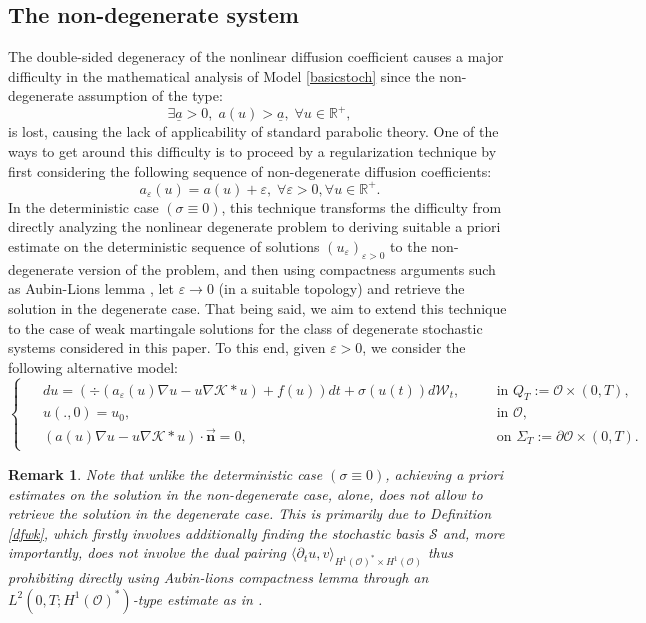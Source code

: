 \documentclass[10pt,number,preprint,times]{elsarticle}
\numberwithin{equation}{section} %
\newtheorem{rem}{Remark}[section]
\begin{document}
\subsection{The non-degenerate system}
The double-sided degeneracy of the nonlinear diffusion coefficient causes a major difficulty in the mathematical analysis of Model \eqref{basicstoch} since the non-degenerate assumption of the type: 
$$
\exists \underline{a}>0,\; a(u)>\underline{a}, \; \forall u \in \mathbb{R}^+,
$$
is lost, causing the lack of applicability of standard parabolic theory. One of the ways to get around this difficulty is to proceed by a regularization technique by first considering the following sequence of non-degenerate diffusion coefficients:
$$
a_\varepsilon(u)=a(u)+\varepsilon,\; \forall \varepsilon>0, \forall u \in \mathbb{R}^+.
$$ 
In the deterministic case $(\sigma \equiv 0)$, this technique transforms the difficulty from directly analyzing the nonlinear degenerate problem to deriving suitable a priori estimate on the deterministic sequence of solutions $\left(u_\varepsilon\right)_{\varepsilon>0}$ to the non-degenerate version of the problem, and then using compactness arguments such as Aubin-Lions lemma \cite{simon1986compact}, let $\varepsilon \rightarrow 0$ (in a suitable topology) and retrieve the solution in the degenerate case. That being said, we aim to extend this technique to the case of weak martingale solutions for the class of degenerate stochastic systems considered in this paper. To this end, given $\varepsilon>0$, we consider the following alternative model:
\begin{equation}\label{basicstochnondeg}
	\begin{cases}
		\begin{split}
			&du=\left(\div\left(a_\varepsilon(u) \nabla u-u \nabla \mathcal{K} \ast u\right)+f(u)\right)dt+\sigma(u(t))d\mathcal{W}_t, &&\quad \text{in } Q_T:=\mathcal{O} \times (0,T),\\
			&u(.,0)=u_0,  &&\quad \text{in } \mathcal{O},\\
			&\left(a(u)\nabla u-u \nabla \mathcal{K} \ast u\right) \cdot \overrightarrow{\textbf{n}}=0, \;\; &&\quad \text{on } \Sigma_T:=\partial \mathcal{O} \times (0,T).
		\end{split}
	\end{cases}
\end{equation}
\begin{rem}
Note that unlike the deterministic case $(\sigma \equiv 0)$, achieving a priori estimates on the solution in the non-degenerate case, alone, does not allow to retrieve the solution in the degenerate case. This is primarily due to Definition \ref{dfwk}, which firstly involves additionally finding the stochastic basis $\mathcal{S}$ and, more importantly, does not involve the dual pairing $\langle \partial_t u,v \rangle_{H^1(\mathcal{O})^* \times H^1(\mathcal{O})}$ thus prohibiting directly using Aubin-lions compactness lemma through an $L^2(0,T;H^1(\mathcal{O})^*)$-type estimate as in \cite{bendahmane2023optimal}.
\end{rem}
\end{document}
